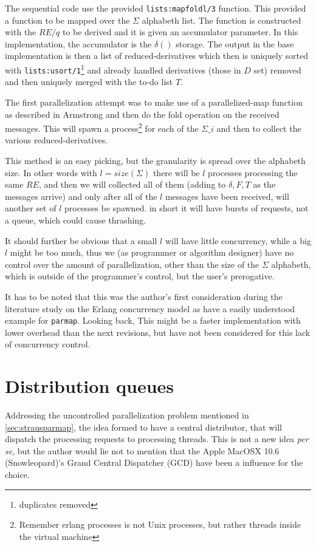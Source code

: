 \documentclass[a4paper,11pt]{report}
\begin{document}
The sequential code use the provided
\texttt{lists:mapfoldl/3} function. This provided a function to be
mapped over the $\Sigma$ alphabeth list. The function is constructed
with the $RE/q$ to be derived and it is given an accumulator
parameter. In this implementation, the accumulator is the
$\delta()$ storage. The output in the base implementation is then a
list of reduced-derivatives which then is uniquely sorted
with \texttt{lists:usort/1}\footnote{duplicates removed} and already
handled derivatives (those in $D$ set) removed and then uniquely
merged with the to-do list $T$.

The first parallelization attempt was to make use of a
parallelized-map function as described in Armstrong\cite{joe:09} and
then do the fold operation on the received messages. This will spawn a
process\footnote{Remember erlang processes is not Unix processes, but
	rather threads inside the virtual machine} for each of the
$\Sigma\_i$ and then to collect the various reduced-derivatives.

This method is an easy picking, but the granularity is spread
over the alphabeth size. In other words with $l=size(\Sigma)$ there
will be $l$ processes processing the same $RE$, and then we will
collected all of them (adding to $\delta,F,T$ as the messages arrive)
and only after all of the $l$ messages have been received, will
another set of $l$ processes be spawned. in short it will have bursts
of requests, not a queue, which could cause thrashing.

It should further be obvious that a small $l$ will have little
concurrency, while a big $l$ might be too much, thus we (as programmer
or algorithm designer) have
no control over the amount of parallelization, other than the size of
the $\Sigma$ alphabeth, which is outside of the programmer's
control, but the user's prerogative.

It has to be noted that this was the author's first consideration
during the literature study on the Erlang concurrency model as
\cite{joe:09} have a easily understood example for \texttt{parmap}. Looking
back, This might be a faster implementation with lower overhead than
the next revisions, but have not been considered for this lack of
concurrency control.

\section{Distribution queues}
\label{sec:distribution-queues}

Addressing the uncontrolled parallelization problem mentioned in
\autoref{sec:strausparmap}, the idea formed to have a central distributor,
that will dispatch the processing requests to processing threads. This
is not a new idea \emph{per se}, but the author would lie not to
mention that the Apple MacOSX 10.6 (Snowleopard)'s Grand Central
Dispatcher (GCD) have been a influence for the choice. 
\end{document}
